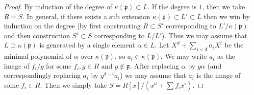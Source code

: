\documentclass[10pt,a4paper]{amsart}
\theoremstyle{plain}
\theoremstyle{definition}
\theoremstyle{remark}
\numberwithin{equation}{subsection}
\begin{document}
\begin{proof}
By induction of the degree of $\kappa(\mathfrak p) \subset L$.
If the degree is $1$, then we take $R = S$.
In general, if there exists a sub extension
$\kappa(\mathfrak p) \subset L' \subset L$ then we win by induction
on the degree (by first constructing $R \subset S'$ corresponding
to $L'/\kappa(\mathfrak p)$ and then construction $S' \subset S$
corresponding to $L/L'$). Thus we may assume that
$L \supset \kappa(\mathfrak p)$ is generated by a single element
$\alpha \in L$. Let $X^d + \sum_{i < d} a_iX^i$ be the minimal polynomial
of $\alpha$ over $\kappa(\mathfrak p)$, so $a_i \in \kappa(\mathfrak p)$.
We may write $a_i$ as the image
of $f_i/g$ for some $f_i, g \in R$ and $g \not \in \mathfrak p$.
After replacing $\alpha$ by $g\alpha$ (and correspondingly
replacing $a_i$ by $g^{d - i}a_i$) we may assume that $a_i$ is
the image of some $f_i \in R$.
Then we simply take $S = R[x]/(x^d + \sum f_ix^i)$.
\end{proof}
\end{document}
